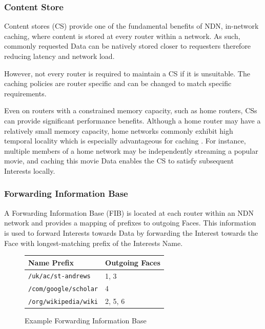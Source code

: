 \documentclass[12pt]{report}
\begin{document}
\subsubsection{Content Store}
Content stores (CS) provide one of the fundamental benefits of NDN, in-network caching, where content is stored at every router within a network. As such, commonly requested Data can be natively stored closer to requesters therefore reducing latency and network load.


However, not every router is required to maintain a CS if it is unsuitable. The caching policies are router specific and can be changed to match specific requirements. 


Even on routers with a constrained memory capacity, such as home routers, CSs can provide significant performance benefits. Although a home router may have a relatively small memory capacity, home networks commonly exhibit high temporal locality which is especially advantageous for caching \cite{dabirmoghaddam_understanding_2014}. For instance, multiple members of a home network may be independently streaming a popular movie, and caching this movie Data enables the CS to satisfy subsequent Interests locally.

\subsubsection{Forwarding Information Base}
A Forwarding Information Base (FIB) is located at each router within an NDN network and provides a mapping of prefixes to outgoing Faces. This information is used to forward Interests towards Data by forwarding the Interest towards the Face with longest-matching prefix of the Interests Name.

\begin{figure}[h!]
    \centering
    \begin{tabular}{|l|l|}
    \hline
    \textbf{Name Prefix} & \textbf{Outgoing Faces} \\ \hline
    \texttt{/uk/ac/st-andrews} & 1, 3 \\ \hline
    \texttt{/com/google/scholar} & 4 \\ \hline
    \texttt{/org/wikipedia/wiki} & 2, 5, 6 \\ \hline
    \end{tabular}
    \caption{Example Forwarding Information Base}
    \label{tab:fib_example}
\end{figure}
\end{document}
